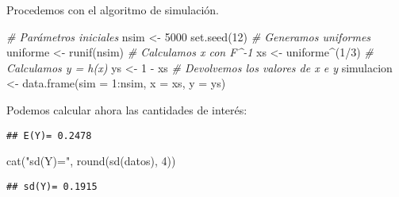 \documentclass[
]{book}
\newenvironment{Shaded}{\begin{snugshade}}{\end{snugshade}}
\newcommand{\AttributeTok}[1]{\textcolor[rgb]{0.77,0.63,0.00}{#1}}
\newcommand{\CommentTok}[1]{\textcolor[rgb]{0.56,0.35,0.01}{\textit{#1}}}
\newcommand{\DecValTok}[1]{\textcolor[rgb]{0.00,0.00,0.81}{#1}}
\newcommand{\FunctionTok}[1]{\textcolor[rgb]{0.00,0.00,0.00}{#1}}
\newcommand{\NormalTok}[1]{#1}
\newcommand{\OtherTok}[1]{\textcolor[rgb]{0.56,0.35,0.01}{#1}}
\newcommand{\SpecialCharTok}[1]{\textcolor[rgb]{0.00,0.00,0.00}{#1}}
\newcommand{\StringTok}[1]{\textcolor[rgb]{0.31,0.60,0.02}{#1}}
\theoremstyle{definition}
\theoremstyle{definition}
\theoremstyle{definition}
\theoremstyle{definition}
\theoremstyle{remark}
\begin{document}
Procedemos con el algoritmo de simulación.

\begin{Shaded}
\begin{Highlighting}[]
\CommentTok{\# Parámetros iniciales}
\NormalTok{nsim }\OtherTok{\textless{}{-}} \DecValTok{5000}
\FunctionTok{set.seed}\NormalTok{(}\DecValTok{12}\NormalTok{)}
\CommentTok{\# Generamos uniformes }
\NormalTok{uniforme }\OtherTok{\textless{}{-}} \FunctionTok{runif}\NormalTok{(nsim)}
\CommentTok{\# Calculamos x con F\^{}{-}1}
\NormalTok{xs }\OtherTok{\textless{}{-}}\NormalTok{ uniforme}\SpecialCharTok{\^{}}\NormalTok{(}\DecValTok{1}\SpecialCharTok{/}\DecValTok{3}\NormalTok{)}
\CommentTok{\# Calculamos y = h(x)}
\NormalTok{ys }\OtherTok{\textless{}{-}} \DecValTok{1} \SpecialCharTok{{-}}\NormalTok{ xs}
\CommentTok{\# Devolvemos los valores de x e y}
\NormalTok{simulacion }\OtherTok{\textless{}{-}} \FunctionTok{data.frame}\NormalTok{(}\AttributeTok{sim =} \DecValTok{1}\SpecialCharTok{:}\NormalTok{nsim, }\AttributeTok{x =}\NormalTok{ xs, }\AttributeTok{y =}\NormalTok{ ys)}
\end{Highlighting}
\end{Shaded}

Podemos calcular ahora las cantidades de interés:

\begin{Shaded}
\end{Shaded}

\begin{verbatim}
## E(Y)= 0.2478
\end{verbatim}

\begin{Shaded}
\begin{Highlighting}[]
\FunctionTok{cat}\NormalTok{(}\StringTok{"sd(Y)="}\NormalTok{, }\FunctionTok{round}\NormalTok{(}\FunctionTok{sd}\NormalTok{(datos), }\DecValTok{4}\NormalTok{))}
\end{Highlighting}
\end{Shaded}

\begin{verbatim}
## sd(Y)= 0.1915
\end{verbatim}
\end{document}
